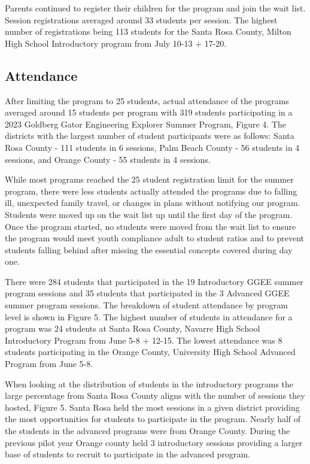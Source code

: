 \documentclass[
]{article}
\begin{document}
Parents continued to register their children for the program and join
the wait list. Session registrations averaged around 33 students per
session. The highest number of registrations being 113 students for the
Santa Rosa County, Milton High School Introductory program from July
10-13 + 17-20.

\hypertarget{attendance}{%
\subsection{Attendance}\label{attendance}}

After limiting the program to 25 students, actual attendance of the
programs averaged around 15 students per program with 319 students
participating in a 2023 Goldberg Gator Engineering Explorer Summer
Program, Figure 4. The districts with the largest number of student
participants were as follows: Santa Rosa County - 111 students in 6
sessions, Palm Beach County - 56 students in 4 sessions, and Orange
County - 55 students in 4 sessions.

While most programs reached the 25 student registration limit for the
summer program, there were less students actually attended the programs
due to falling ill, unexpected family travel, or changes in plans
without notifying our program. Students were moved up on the wait list
up until the first day of the program. Once the program started, no
students were moved from the wait list to ensure the program would meet
youth compliance adult to student ratios and to prevent students falling
behind after missing the essential concepts covered during day one.

There were 284 students that participated in the 19 Introductory GGEE
summer program sessions and 35 students that participated in the 3
Advanced GGEE summer program sessions. The breakdown of student
attendance by program level is shown in Figure 5. The highest number of
students in attendance for a program was 24 students at Santa Rosa
County, Navarre High School Introductory Program from June 5-8 + 12-15.
The lowest attendance was 8 students participating in the Orange County,
University High School Advanced Program from June 5-8.

When looking at the distribution of students in the introductory
programs the large percentage from Santa Rosa County aligns with the
number of sessions they hosted, Figure 5. Santa Rosa held the most
sessions in a given district providing the most opportunities for
students to participate in the program. Nearly half of the students in
the advanced programs were from Orange County. During the previous pilot
year Orange county held 3 introductory sessions providing a larger base
of students to recruit to participate in the advanced program.
\end{document}
